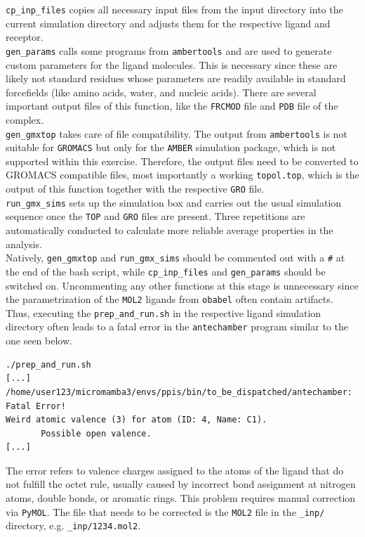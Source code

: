 \documentclass[9pt,tutorial]{livecoms}
\newcommand{\code}[1]{\colorbox{light-gray}{\texttt{#1}}}
\begin{document}
\code{cp\_inp\_files} copies all necessary input files from the input directory into the current simulation directory and adjusts them for the respective ligand and receptor.\\
\code{gen\_params} calls some programs from \code{ambertools} and are used to generate custom parameters for the ligand molecules. This is necessary since these are likely not standard residues whose parameters are readily available in standard forcefields (like amino acids, water, and nucleic acids). There are several important output files of this function, like the \texttt{FRCMOD} file and \texttt{PDB} file of the complex.\\
\code{gen\_gmxtop} takes care of file compatibility. The output from \code{ambertools} is not suitable for \texttt{GROMACS} but only for the \texttt{AMBER} simulation package, which is not supported within this exercise. Therefore, the output files need to be converted to GROMACS compatible files, most importantly a working \code{topol.top}, which is the output of this function together with the respective \texttt{GRO} file.\\
\code{run\_gmx\_sims} sets up the simulation box and carries out the usual simulation sequence once the \texttt{TOP} and \texttt{GRO} files are present. Three repetitions are automatically conducted to calculate more reliable average properties in the analysis.\\
Natively, \code{gen\_gmxtop} and \code{run\_gmx\_sims} should be commented out with a \code{\#} at the end of the bash script, while \code{cp\_inp\_files} and \code{gen\_params} should be switched on. Uncommenting any other functions at this stage is unnecessary since the parametrization of the \texttt{MOL2} ligands from \code{obabel} often contain artifacts. Thus, executing the \code{prep\_and\_run.sh} in the respective ligand simulation directory often leads to a fatal error in the \code{antechamber} program similar to the one seen below.
\begin{lstlisting}
./prep_and_run.sh
[...]
/home/user123/micromamba3/envs/ppis/bin/to_be_dispatched/antechamber: Fatal Error!
Weird atomic valence (3) for atom (ID: 4, Name: C1).
       Possible open valence.
[...]
\end{lstlisting}
The error refers to valence charges assigned to the atoms of the ligand that do not fulfill the octet rule, usually caused by incorrect bond assignment at nitrogen atoms, double bonds, or aromatic rings. This problem requires manual correction via \texttt{PyMOL}. The file that needs to be corrected is the \texttt{MOL2} file in the \code{\_inp/} directory, e.g. \code{\_inp/1234.mol2}. 
\end{document}
